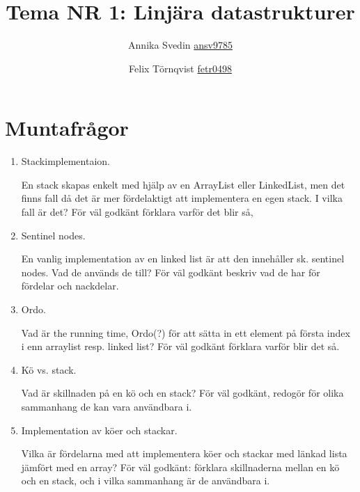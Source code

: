 \documentclass[a5paper,10pt,oneside]{article}
\title{Tema NR 1: Linjära datastrukturer}
\author{Annika Svedin \url{ansv9785} \and Felix Törnqvist \url{fetr0498}}
\begin{document}
\maketitle

\section*{Muntafrågor}

\begin{enumerate}

\item Stackimplementaion.

En stack skapas enkelt med hjälp av en ArrayList eller LinkedList, men det finns fall då det är mer fördelaktigt att implementera en egen stack. I vilka fall är det?
För väl godkänt förklara varför det blir så,

\item Sentinel nodes.

En vanlig implementation av en linked list är att den innehåller sk. sentinel nodes. Vad de används de till? 
För väl godkänt beskriv vad de har för fördelar och nackdelar.

\item Ordo.

Vad är the running time, Ordo(?) för att sätta in ett element på första index i enn arraylist resp. linked list? 
För väl godkänt förklara varför blir det så.

\item Kö vs. stack.

Vad är skillnaden på en kö och en stack? För väl godkänt, redogör för olika sammanhang de kan vara användbara i.

\item Implementation av köer och stackar.

Vilka är fördelarna med att implementera köer och stackar med länkad lista jämfört med en array?
För väl godkänt: förklara skillnaderna mellan en kö och en stack, och i vilka sammanhang är de användbara i.

\end{enumerate}
\end{document}

